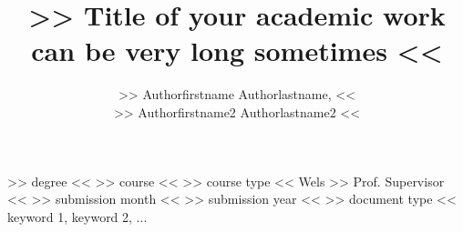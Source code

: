 	\title
		{>> Title of your academic work can be very long sometimes <<}
	\author    %
		{>> Authorfirstname Authorlastname, << \\ >> Authorfirstname2 Authorlastname2 <<}


	\degree
		{>> degree <<}
	\course
		{>> course <<}
	\coursestype
		{>> course type <<}
	\location
		{Wels}
	\supervisor
		{>> Prof. Supervisor <<}
	\submonth
		{>> submission month <<}
	\subyear
		{>> submission year <<}
	\doctype
		{>> document type <<}
	\keywords
		{keyword 1, keyword 2, ...}
